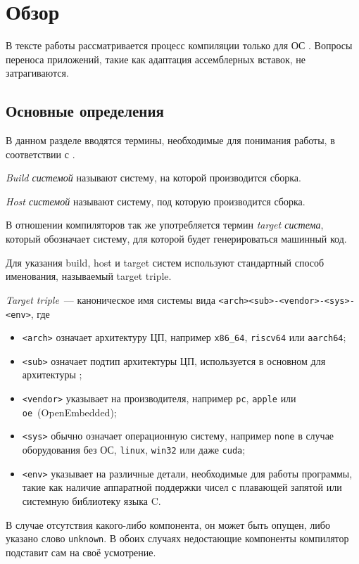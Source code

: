 
\section{Обзор}
\label{sec:relatedworks}

В тексте работы рассматривается процесс компиляции только для ОС \linux{}.
Вопросы переноса приложений, такие как адаптация ассемблерных вставок, не затрагиваются.

\subsection{Основные определения}
\label{subsec:defs}

В данном разделе вводятся термины, необходимые для понимания работы, в соответствии с \cite{mackenzieCreatingAutomaticConfiguration2021, WelcomeClangDocumentation}.
\begin{definition}[Build]
	\textit{Build системой} называют систему, на которой производится сборка.
\end{definition}
\begin{definition}[Host]
	\textit{Host системой} называют систему, под которую производится сборка.
\end{definition}
\begin{definition}[Target]
	В отношении компиляторов так же употребляется термин \textit{target система}, который обозначает систему, для которой будет генерироваться машинный код.
\end{definition}

Для указания build, host и target систем используют стандартный способ именования, называемый target triple.

\begin{definition}
	\textit{Target triple}~--- каноническое имя системы вида \texttt{<arch><sub>-<vendor>-<sys>-<env>}, где
	\begin{itemize}
		\item \texttt{<arch>} означает архитектуру ЦП, например \texttt{x86\_64}, \texttt{riscv64} или \texttt{aarch64};
		\item \texttt{<sub>} означает подтип архитектуры ЦП, используется в основном для архитектуры \arm{};
		\item \texttt{<vendor>} указывает на производителя, например \texttt{pc}, \texttt{apple} или \texttt{oe}~(OpenEmbedded);
		\item \texttt{<sys>} обычно означает операционную систему, например \texttt{none} в случае оборудования без ОС, \texttt{linux}, \texttt{win32} или даже \texttt{cuda};
		\item \texttt{<env>} указывает на различные детали, необходимые для работы программы, такие как наличие аппаратной поддержки чисел с плавающей запятой или системную библиотеку языка \textsc{C}.
	\end{itemize}
	В случае отсутствия какого-либо компонента, он может быть опущен, либо указано слово \texttt{unknown}.
	В обоих случаях недостающие компоненты компилятор подставит сам на своё усмотрение.
\end{definition}

